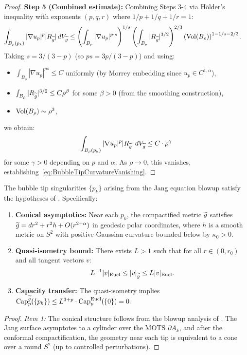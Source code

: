 \begin{proof}
\textbf{Step 5 (Combined estimate):} Combining Steps 3-4 via H\"older's inequality with exponents $(p, q, r)$ where $1/p + 1/q + 1/r = 1$:
\begin{align}
    \int_{B_\rho(p_k)} |\nabla u_p|^p |R_{\widetilde{g}}| \, dV_{\widetilde{g}} &\le \left( \int_{B_\rho} |\nabla u_p|^{p \cdot s} \right)^{1/s} \left( \int_{B_\rho} |R_{\widetilde{g}}|^{3/2} \right)^{2/3} \left( \operatorname{Vol}(B_\rho) \right)^{1-1/s-2/3}.
\end{align}
Taking $s = 3/(3-p)$ (so $ps = 3p/(3-p)$) and using:
\begin{itemize}
    \item $\int_{B_\rho} |\nabla u_p|^{ps} \le C$ uniformly (by Morrey embedding since $u_p \in C^{1,\alpha}$),
    \item $\int_{B_\rho} |R_{\widetilde{g}}|^{3/2} \le C \rho^{\beta}$ for some $\beta > 0$ (from the smoothing construction),
    \item $\operatorname{Vol}(B_\rho) \sim \rho^3$,
\end{itemize}
we obtain:
\begin{equation}
    \int_{B_\rho(p_k)} |\nabla u_p|^p |R_{\widetilde{g}}| \, dV_{\widetilde{g}} \le C \cdot \rho^{\gamma}
\end{equation}
for some $\gamma > 0$ depending on $p$ and $\alpha$. As $\rho \to 0$, this vanishes, establishing~\eqref{eq:BubbleTipCurvatureVanishing}.
\end{proof}

\begin{proposition}\label{prop:JangCapacity}
The bubble tip singularities $\{p_k\}$ arising from the Jang equation blowup satisfy the hypotheses of . Specifically:
\begin{enumerate}
    \item \textbf{Conical asymptotics:} Near each $p_k$, the compactified metric $\widetilde{g}$ satisfies $\widetilde{g} = dr^2 + r^2 h + O(r^{2+\alpha})$ in geodesic polar coordinates, where $h$ is a smooth metric on $S^2$ with positive Gaussian curvature bounded below by $\kappa_0 > 0$.
    
    \item \textbf{Quasi-isometry bound:} There exists $L > 1$ such that for all $r \in (0, r_0)$ and all tangent vectors $v$:
    \begin{equation}
        L^{-1} |v|_{\text{Eucl}} \le |v|_{\widetilde{g}} \le L |v|_{\text{Eucl}}.
    \end{equation}
    
    \item \textbf{Capacity transfer:} The quasi-isometry implies $\text{Cap}_p^{\widetilde{g}}(\{p_k\}) \le L^{3+p} \cdot \text{Cap}_p^{\text{Eucl}}(\{0\}) = 0$.
\end{enumerate}
\end{proposition}
\begin{proof}
\textit{Item 1:} The conical structure follows from the blowup analysis of . The Jang surface asymptotes to a cylinder over the MOTS $\partial A_k$, and after the conformal compactification, the geometry near each tip is equivalent to a cone over a round $S^2$ (up to controlled perturbations).

\end{proof}

